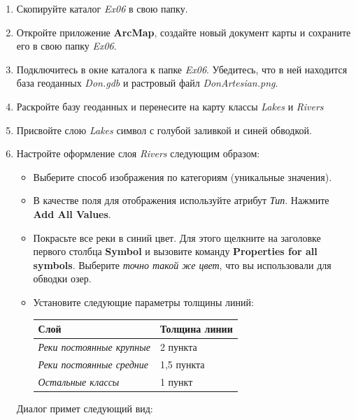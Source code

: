 \documentclass[]{book}
\theoremstyle{definition}
\theoremstyle{definition}
\theoremstyle{definition}
\theoremstyle{remark}
\begin{document}
\begin{enumerate}
\def\labelenumi{\arabic{enumi}.}
\item
  Скопируйте каталог \emph{Ex06} в свою папку.
\item
  Откройте приложение \textbf{ArcMap}, создайте новый документ карты и
  сохраните его в свою папку \emph{Ex06}.
\item
  Подключитесь в окне каталога к папке \emph{Ex06}. Убедитесь, что в ней
  находится база геоданных \emph{Don.gdb} и растровый файл
  \emph{DonArtesian.png}.
\item
  Раскройте базу геоданных и перенесите на карту классы \emph{Lakes} и
  \emph{Rivers}
\item
  Присвойте слою \emph{Lakes} символ с голубой заливкой и синей
  обводкой.
\item
  Настройте оформление слоя \emph{Rivers} следующим образом:

  \begin{itemize}
  \item
    Выберите способ изображения по категориям (уникальные значения).
  \item
    В качестве поля для отображения используйте атрибут \emph{Тип}.
    Нажмите \textbf{Add All Values}.
  \item
    Покрасьте все реки в синий цвет. Для этого щелкните на заголовке
    первого столбца \textbf{Symbol} и вызовите команду
    \textbf{Properties for all symbols}. Выберите \emph{точно такой же
    цвет}, что вы использовали для обводки озер.
  \item
    Установите следующие параметры толщины линий:

    \begin{longtable}[]{@{}ll@{}}
    \toprule
    Слой & Толщина линии\tabularnewline
    \midrule
    \endhead
    \emph{Реки постоянные крупные} & 2 пункта\tabularnewline
    \emph{Реки постоянные средние} & 1,5 пункта\tabularnewline
    \emph{Остальные классы} & 1 пункт\tabularnewline
    \bottomrule
    \end{longtable}
  \end{itemize}

  Диалог примет следующий вид:


\end{enumerate}
\end{document}
